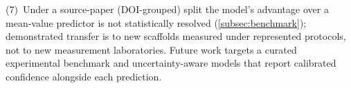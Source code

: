 (7)~Under a source-paper (DOI-grouped) split the model's advantage over a
mean-value predictor is not statistically resolved (\cref{subsec:benchmark});
demonstrated transfer is to new scaffolds measured under represented protocols,
not to new measurement laboratories.
Future work targets a curated experimental benchmark and uncertainty-aware models
that report calibrated confidence alongside each prediction.
